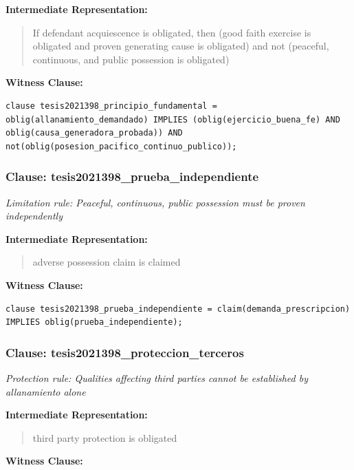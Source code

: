 \documentclass[11pt,a4paper]{article}
\begin{document}
\textbf{Intermediate Representation:}

\begin{quote}
If defendant acquiescence is obligated, then (good faith exercise is obligated and proven generating cause is obligated) and not (peaceful, continuous, and public possession is obligated)
\end{quote}

\textbf{Witness Clause:}

\begin{lstlisting}[style=witnessstyle, language=Witness]
clause tesis2021398_principio_fundamental = oblig(allanamiento_demandado) IMPLIES (oblig(ejercicio_buena_fe) AND oblig(causa_generadora_probada)) AND not(oblig(posesion_pacifico_continuo_publico));
\end{lstlisting}

\subsubsection{Clause: tesis2021398\_prueba\_independiente}

\textit{Limitation rule: Peaceful, continuous, public possession must be proven independently}

\textbf{Intermediate Representation:}

\begin{quote}
adverse possession claim is claimed
\end{quote}

\textbf{Witness Clause:}

\begin{lstlisting}[style=witnessstyle, language=Witness]
clause tesis2021398_prueba_independiente = claim(demanda_prescripcion) IMPLIES oblig(prueba_independiente);
\end{lstlisting}

\subsubsection{Clause: tesis2021398\_proteccion\_terceros}

\textit{Protection rule: Qualities affecting third parties cannot be established by allanamiento alone}

\textbf{Intermediate Representation:}

\begin{quote}
third party protection is obligated
\end{quote}

\textbf{Witness Clause:}
\end{document}
